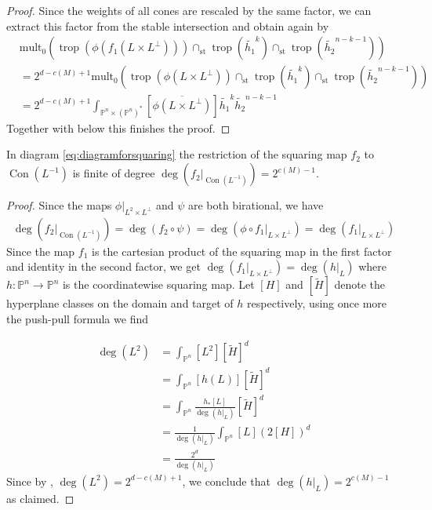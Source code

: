 \documentclass[12pt,a4paper,english]{scrartcl}
\newcommand{\PP}{\mathbb{P}}
\DeclareMathOperator{\trop}{trop}
\DeclareMathOperator{\Con}{Con}
\begin{document}
\begin{proof}
  Since the weights of all cones are rescaled by the same factor, we can extract this factor from the stable intersection and obtain again by \cite[Theorem 6.7.9]{Maclagan2015} \begin{align*}
      &\text{mult}_0(\trop(\phi(f_1(L\times L^\perp)))\cap_{\text{st}}\trop(\widetilde{h_1}^k)\cap_{\text{st}}\trop(\widetilde{h_2}^{n-k-1}))\\
      &=2^{d-c(M)+1}\text{mult}_0(\trop(\phi(L\times L^\perp))\cap_{\text{st}}\trop(\widetilde{h_1}^k)\cap_{\text{st}}\trop(\widetilde{h_2}^{n-k-1})) \\
      &=2^{d-c(M)+1}\int_{\PP^n\times (\PP^n)^*}[\overline{\phi(L\times L^\perp)}]\widetilde{h_1}^k\widetilde{h_2}^{n-k-1}
  \end{align*}
  Together with  below this finishes the proof.
\end{proof}
\begin{lemma}
    \label{lem:degreeofsquaringCon}
    In diagram \eqref{eq:diagramforsquaring} the restriction of the squaring map $f_2$ to $\Con(L^{-1})$ is finite of degree $\deg(f_2|_{\Con(L^{-1})})=2^{c(M)-1}$.
\end{lemma}
\begin{proof}
    Since the maps $\phi|_{L^2\times L^\perp}$ and $\psi$ are both birational, we have \begin{align*}
        \deg(f_2|_{\Con(L^{-1})})=\deg(f_2\circ \psi)=\deg(\phi \circ f_1|_{L\times L^\perp})=\deg(f_1|_{L\times L^\perp})
    \end{align*}
    Since the map $f_1$ is the cartesian product of the squaring map in the first factor and identity in the second factor, we get $\deg(f_1|_{L\times L^\perp})=\deg(h|_L)$ where $h:\PP^n\to \PP^n$ is the coordinatewise squaring map. Let $[H]$ and $[\widetilde{H}]$ denote the hyperplane classes on the domain and target of $h$ respectively, using once more the push-pull formula we find
    
    \begin{align*}
        \deg(L^2)&=\int_{\PP^n}[L^2][\widetilde{H}]^d\\
        &=\int_{\PP^n}[h(L)][\widetilde{H}]^d \\
        &=\int_{\PP^n}\frac{h_*[L]}{\deg(h|_L)}[\widetilde{H}]^d \\
        &=\frac{1}{\deg(h|_L)}\int_{\PP^n}[L](2[H])^d \\
        &=\frac{2^d}{\deg(h|_L)}  
    \end{align*}
    Since by \cite[Theorem 2.6]{Dey2020}, $\deg(L^2) = 2^{d-c(M)+1}$,
    we conclude that $\deg(h|_L)=2^{c(M)-1}$ as claimed. 
\end{proof}
\end{document}
